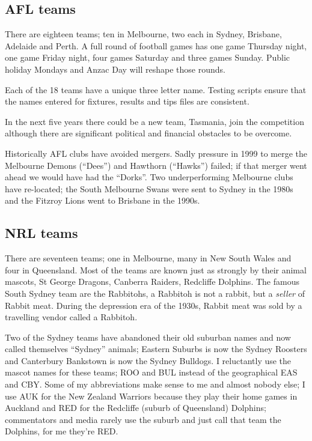 \documentclass{article}      %
\begin{document}
\subsection{AFL teams}

There are eighteen teams; ten in Melbourne, two each in Sydney, Brisbane,
Adelaide and Perth. A full round of football games has one game
Thursday night, one game Friday night, four games Saturday and three
games Sunday. Public holiday Mondays and Anzac Day will reshape those
rounds.

Each of the 18 teams have a unique three letter name. Testing scripts
ensure that the names entered for fixtures, results and tips files are
consistent.

In the next five years there could be a new team, Tasmania, join the
competition although there are significant political and financial
obstacles to be overcome.

Historically AFL clubs have avoided mergers. Sadly pressure in 1999 to
merge the Melbourne Demons (``Dees'') and Hawthorn (``Hawks'')
failed; if that merger went ahead we would have had the ``Dorks''.
Two underperforming Melbourne clubs have re-located; the South
Melbourne Swans were sent to Sydney in the 1980s and the Fitzroy Lions
went to Brisbane in the 1990s.

\subsection{NRL teams}

There are seventeen teams; one in Melbourne, many in New South Wales
and four in Queensland. Most of the teams are known just as strongly
by their animal mascots, St George Dragons, Canberra Raiders,
Redcliffe Dolphins. The famous South Sydney team are the Rabbitohs, a
Rabbitoh is not a rabbit, but a \textit{seller} of Rabbit meat. During
the depression era of the 1930s, Rabbit meat was sold by a travelling
vendor called a Rabbitoh.

Two of the Sydney teams have abandoned their old suburban names
and now called themselves ``Sydney'' animals; Eastern Suburbs is now
the Sydney Roosters and Canterbury Bankstown is now the Sydney
Bulldogs. I reluctantly use the mascot names for these teams; ROO and
BUL instead of the geographical EAS and CBY. Some of my abbreviations
make sense to me and almost nobody else; I use AUK for the New Zealand
Warriors because they play their home games in Auckland and RED for
the Redcliffe (suburb of Queensland) Dolphins; commentators and media
rarely use the suburb and just call that team the Dolphins, for me
they're RED.
\end{document}
